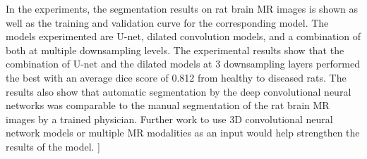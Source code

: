 \documentclass[13pt,MS]{ucdavisthesis}
\begin{document}
\par
In the experiments, the segmentation results on rat brain MR images is shown as well as the training and validation curve for the corresponding model. 
The models experimented are U-net, dilated convolution models, and a combination of both at multiple downsampling levels. 
The experimental results show that the combination of U-net and the dilated models at 3 downsampling layers performed the best with an average dice score of 0.812 from healthy to diseased rats.
The results also show that automatic segmentation by the deep convolutional neural networks was comparable to the manual segmentation of the rat brain MR images by a trained physician. 
Further work to use 3D convolutional neural network models or multiple MR modalities as an input would help strengthen the results of the model.
]
\end{document}
